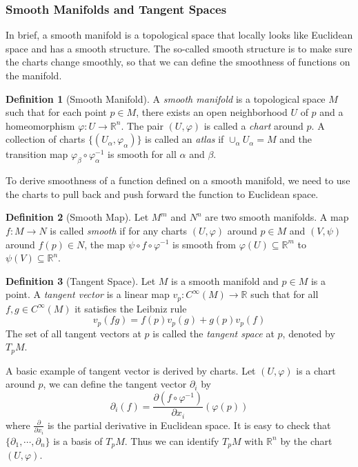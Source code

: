 \documentclass[12pt,a4paper,draft]{article}  %
\theoremstyle{definition}
\newtheorem{definition}{Definition}[section]
\numberwithin{equation}{section}
\newcommand{\RR}{\mathbb{R}}
\begin{document}
\subsubsection{Smooth Manifolds and Tangent Spaces}
In brief, a smooth manifold is a topological space that locally looks like Euclidean space and has a smooth structure. The so-called smooth structure is to make sure the charts change smoothly, so that we can define the smoothness of functions on the manifold. 
\begin{definition}[Smooth Manifold]
        A \emph{smooth manifold} is a topological space $M$ such that for each point $p \in M$, there exists an open neighborhood $U$ of $p$ and a homeomorphism $\varphi: U \to \RR^n$. The pair $(U, \varphi)$ is called a \emph{chart} around $p$. A collection of charts $\{(U_\alpha, \varphi_\alpha)\}$ is called an \emph{atlas} if $\cup_\alpha U_\alpha = M$ and the transition map $\varphi_\beta \circ \varphi_\alpha^{-1}$ is smooth for all $\alpha$ and $\beta$.
\end{definition}
To derive smoothness of a function defined on a smooth manifold, we need to use the charts to pull back and push forward the function to Euclidean space.
\begin{definition}[Smooth Map]
        Let $M^m$ and $N^n$ are two smooth manifolds. A map $f: M \to N$ is called \emph{smooth} if for any charts $(U, \varphi)$ around $p \in M$ and $(V, \psi)$ around $f(p) \in N$, the map $\psi \circ f \circ \varphi^{-1}$ is smooth from $\varphi(U)\subseteq \RR^m$ to $\psi(V)\subseteq \RR^n$.
\end{definition}
\begin{definition}[Tangent Space]
        Let $M$ is a smooth manifold and $p \in M$ is a point. A \emph{tangent vector} is a linear map $v_p: C^\infty(M) \to \RR$ such that for all $f,g \in C^\infty(M)$ it satisfies the Leibniz rule
        \[
        v_p(fg) = f(p) v_p(g) + g(p) v_p(f)
        \]
        The set of all tangent vectors at $p$ is called the \emph{tangent space} at $p$, denoted by $T_p M$.
\end{definition}
A basic example of tangent vector is derived by charts. Let $(U, \varphi)$ is a chart around $p$, we can define the tangent vector $\partial_i$ by
\[
\partial_i(f) = \frac{\partial (f \circ \varphi^{-1})}{\partial x_i}(\varphi(p))
\]
where $\frac{\partial}{\partial x_i}$ is the partial derivative in Euclidean space. It is easy to check that $\{\partial_1, \cdots, \partial_n\}$ is a basis of $T_p M$. Thus we can identify $T_p M$ with $\RR^n$ by the chart $(U, \varphi)$.
\end{document}
